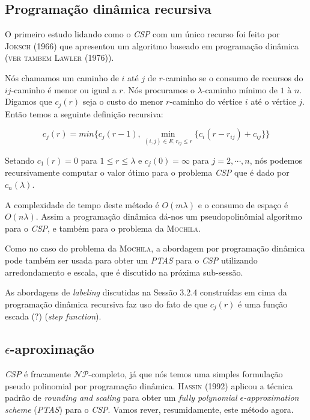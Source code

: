\documentclass[10pt,a4paper]{article}
\begin{document}
\subsection{Programação dinâmica recursiva}

O primeiro estudo lidando como o \emph{CSP} com um único recurso foi 
feito por \textsc{Joksch (1966)} que apresentou um algoritmo baseado em 
programação dinâmica (\textsc{ver tambem Lawler (1976)}).

Nós chamamos um caminho de $i$ até $j$ de $r$-caminho se o consumo de 
recursos do $ij$-caminho é menor ou igual a $r$. Nós procuramos o 
$\lambda$-caminho mínimo de $1$ à $n$. Digamos que $c_j(r)$ seja o custo 
do menor $r$-caminho do vértice $i$ até o vértice $j$. Então temos a 
seguinte definição recursiva:

$$ c_j(r) = min\{
c_j(r - 1), \displaystyle\min_{(i,j) \in E, r_{ij} \le r}\{c_i(r - 
r_{ij}) + c_{ij}\}
\} $$

Setando $c_1(r) = 0$ para $1 \le r \le \lambda$ e $c_j(0) = \infty$ para 
$j = 2, \cdots, n$, nós podemos recursivamente computar o valor ótimo 
para o problema \emph{CSP} que é dado por $c_n(\lambda)$.

A complexidade de tempo deste método é $O(m\lambda)$ e o consumo de 
espaço é $O(n\lambda)$. Assim a programação dinâmica dá-nos um 
pseudopolinômial algoritmo para o \emph{CSP}, e também para o problema 
da \textsc{Mochila}.

Como no caso do problema da \textsc{Mochila}, a abordagem por 
programação dinâmica pode também ser usada para obter um \emph{PTAS} 
para o \emph{CSP} utilizando arredondamento e escala, que é discutido na 
próxima sub-sessão.

As abordagens de \emph{labeling} discutidas na Sessão 3.2.4 construídas 
em cima da programação dinâmica recursiva faz uso do fato de que 
$c_j(r)$ é uma função escada (?) (\emph{step function}).

\subsection{$\epsilon$-aproximação}

\emph{CSP} é fracamente $\mathcal{NP}$-completo, já que nós temos uma 
simples formulação pseudo polinomial por programação dinâmica.  
\textsc{Hassin (1992)} aplicou a técnica padrão de \emph{rounding and 
scaling} para obter um \emph{fully polynomial $\epsilon$-approximation 
scheme} (\emph{PTAS}) para o \emph{CSP}. Vamos rever, resumidamente, 
este método agora.
\end{document}
